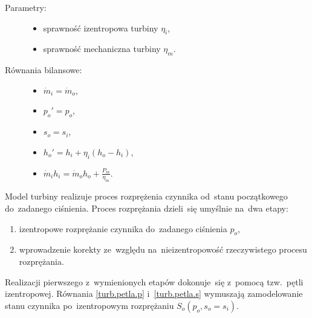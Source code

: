 \begin{description}

	\item[Parametry:] \hfill

		\begin{itemize}

			\item sprawność izentropowa turbiny $\eta_i$,

			\item sprawność mechaniczna turbiny $\eta_m$.

		\end{itemize}

	\item[Równania bilansowe:] \hfill

		\begin{itemize}

			\item \eq$\dot m_i = \dot m_o$,

			\item \eq$p_o' = p_o$,%
				\label{turb.petla.p}

			\item \eq$s_o = s_i$,%
				\label{turb.petla.s}

			\item \eq$h_o' = h_i + \eta_i ( h_o - h_i )$,%
				\label{turb.wyj.h}

			\item \eq$\dot m_i h_i = \dot m_o h_o + \frac{P_m}{\eta_m}$.

		\end{itemize}

\end{description}

Model turbiny realizuje proces rozprężenia czynnika od~stanu
początkowego do~zadanego ciśnienia. Proces rozprężania dzieli~się
umyślnie na~dwa etapy:

\begin{enumerate}

	\item izentropowe rozprężanie czynnika do~zadanego ciśnienia $p_o$,

	\item wprowadzenie korekty ze~względu na~nieizentropowość
		rzeczywistego procesu rozprężania.

\end{enumerate}

Realizacji pierwszego z~wymienionych etapów dokonuje~się z~pomocą
tzw.~pętli izentropowej. Równania \eqref{turb.petla.p}
i~\eqref{turb.petla.s} wymuszają zamodelowanie stanu czynnika
po~izentropowym rozprężaniu $S_o(p_o, s_o=s_i)$.

